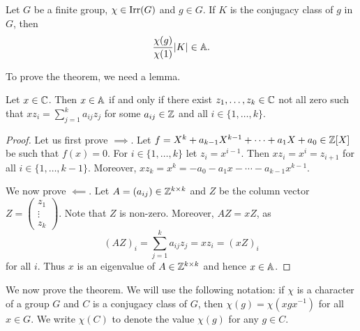 \chapter{}

\begin{theorem}
    Let $G$ be a finite group, $\chi\in\operatorname{Irr}(G)$ and $g\in G$. 
    If $K$ is the conjugacy class of $g$ in $G$, then
    \[
    \frac{\chi(g)}{\chi(1)}|K|\in\mathbb{A}. 
    \]
\end{theorem}

To prove the theorem, we need a lemma. 

\begin{lemma}
    Let $x\in\mathbb{C}$. Then $x\in\mathbb{A}$ if and only if 
    there exist $z_1,\dots,z_k\in\mathbb{C}$ not all zero such that 
    $xz_i=\sum_{j=1}^ka_{ij}z_j$ for some $a_{ij}\in\mathbb{Z}$ and 
    all $i\in\{1,\dots,k\}$. 
\end{lemma}

\begin{proof}
    Let us first prove $\implies$. Let $f=X^k+a_{k-1}X^{k-1}+\cdots+a_1X+a_0\in\mathbb{Z}[X]$
    be such that $f(x)=0$. For $i\in\{1,\dots,k\}$ let 
    $z_i=x^{i-1}$. Then 
    $xz_i=x^i=z_{i+1}$ for all $i\in\{1,\dots,k-1\}$. Moreover, 
    $xz_k=x^k=-a_0-a_1x-\cdots-a_{k-1}x^{k-1}$.
    
    We now prove $\impliedby$. Let $A=(a_{ij})\in\mathbb{Z}^{k\times k}$ and 
    $Z$ be the column vector 
    $Z=\begin{pmatrix}z_1\\\vdots\\z_k\end{pmatrix}$. Note that $Z$ is non-zero. 
    Moreover, $AZ=xZ$, as 
    \[
    (AZ)_i=\sum_{j=1}^ka_{ij}z_j=xz_i=(xZ)_i
    \]
    for all $i$. Thus $x$ is an eigenvalue of $A\in\mathbb{Z}^{k\times k}$ and
    hence $x\in\mathbb{A}$. 
\end{proof}

We now prove the theorem. We will use the following notation: if $\chi$ is a character
of a group $G$ 
and $C$ is a conjugacy class of $G$, then 
$\chi(g)=\chi(xgx^{-1})$ for all $x\in G$. We write 
$\chi(C)$ to denote the value $\chi(g)$ for any $g\in C$. 

